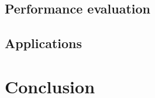 \documentclass[a4paper]{report}
\begin{document}
\section{Performance evaluation}

\section{Applications}

\chapter{Conclusion}



\end{document}
